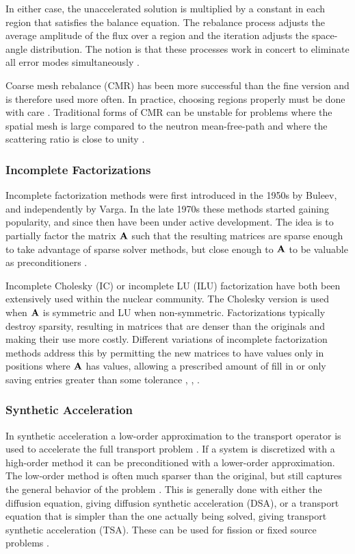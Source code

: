 In either case, the unaccelerated solution is multiplied by a constant in each region that satisfies the balance equation. The rebalance process adjusts the average amplitude of the flux over a region and the iteration adjusts the space-angle distribution. The notion is that these processes work in concert to eliminate all error modes simultaneously \cite{Adams2002}. 

Coarse mesh rebalance (CMR) has been more successful than the fine version and is therefore used more often. In practice, choosing regions properly must be done with care \cite{Lewis1993}. Traditional forms of CMR can be unstable for problems where the spatial mesh is large compared to the neutron mean-free-path and where the scattering ratio is close to unity \cite{Alcouffe1977}. 

\subsubsection{Incomplete Factorizations}
Incomplete factorization methods were first introduced in the 1950s by Buleev, and independently by Varga. In the late 1970s these methods started gaining popularity, and since then have been under active development. The idea is to partially factor the matrix $\mathbf{A}$ such that the resulting matrices are sparse enough to take advantage of sparse solver methods, but close enough to $\mathbf{A}$ to be valuable as preconditioners \cite{Benzi2002}.

Incomplete Cholesky (IC) or incomplete LU (ILU) factorization have both been extensively used within the nuclear community. The Cholesky version is used when $\mathbf{A}$ is symmetric and LU when non-symmetric. Factorizations typically destroy sparsity, resulting in matrices that are denser than the originals and making their use more costly. Different variations of incomplete factorization methods address this by permitting the new matrices to have values only in positions where $\mathbf{A}$ has values, allowing a prescribed amount of fill in or only saving entries greater than some tolerance \cite{Trefethen1997}, \cite{Patton2002}, \cite{Oliveira1998}.

\subsubsection{Synthetic Acceleration}
In synthetic acceleration a low-order approximation to the transport operator is used to accelerate the full transport problem \cite{Lewis1993}. If a system is discretized with a high-order method it can be preconditioned with a lower-order approximation. The low-order method is often much sparser than the original, but still captures the general behavior of the problem \cite{Trefethen1997}. This is generally done with either the diffusion equation, giving diffusion synthetic acceleration (DSA), or a transport equation  that is simpler than the one actually being solved, giving transport synthetic acceleration (TSA). These can be used for fission or fixed source problems \cite{Adams2002}. 

